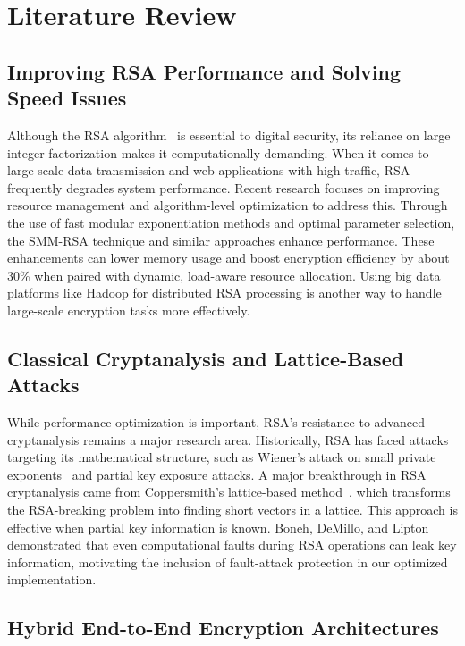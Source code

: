\documentclass[conference]{IEEEtran}
\begin{document}
\section{Literature Review}
\label{sec:litreview}

\subsection{Improving RSA Performance and Solving Speed Issues}

Although the RSA algorithm~\cite{rivest1978} is essential to digital security, its reliance on large integer factorization makes it computationally demanding. When it comes to large-scale data transmission and web applications with high traffic, RSA frequently degrades system performance. Recent research focuses on improving resource management and algorithm-level optimization to address this. Through the use of fast modular exponentiation methods and optimal parameter selection, the SMM-RSA technique and similar approaches enhance performance. These enhancements can lower memory usage and boost encryption efficiency by about 30\% when paired with dynamic, load-aware resource allocation. Using big data platforms like Hadoop for distributed RSA processing is another way to handle large-scale encryption tasks more effectively.

\subsection{Classical Cryptanalysis and Lattice-Based Attacks}

While performance optimization is important, RSA's resistance to advanced cryptanalysis remains a major research area. Historically, RSA has faced attacks targeting its mathematical structure, such as Wiener's attack on small private exponents~\cite{wiener1990} and partial key exposure attacks. A major breakthrough in RSA cryptanalysis came from Coppersmith's lattice-based method~\cite{coppersmith1997}, which transforms the RSA-breaking problem into finding short vectors in a lattice. This approach is effective when partial key information is known. Boneh, DeMillo, and Lipton~\cite{boneh2001} demonstrated that even computational faults during RSA operations can leak key information, motivating the inclusion of fault-attack protection in our optimized implementation.

\subsection{Hybrid End-to-End Encryption Architectures}
\end{document}

